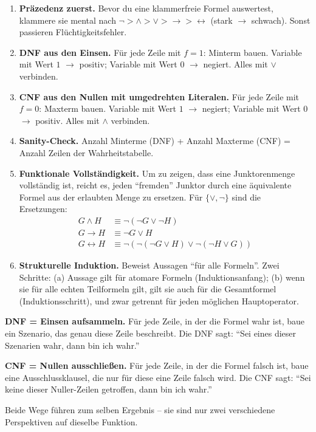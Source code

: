 \documentclass[a4paper,12pt]{article}
\begin{document}
\begin{merkbox}[title={Goldene Regeln zum Mitnehmen}]
\begin{enumerate}
\item \textbf{Pr\"azedenz zuerst.} Bevor du eine klammerfreie Formel
      auswertest, klammere sie mental nach $\neg > \wedge > \vee > \to
      > \leftrightarrow$ (stark $\to$ schwach). Sonst passieren
      Fl\"uchtigkeitsfehler.

\item \textbf{DNF aus den Einsen.} F\"ur jede Zeile mit $f = 1$:
      Minterm bauen. Variable mit Wert $1$ $\to$ positiv; Variable mit
      Wert $0$ $\to$ negiert. Alles mit $\vee$ verbinden.

\item \textbf{CNF aus den Nullen mit umgedrehten Literalen.} F\"ur
      jede Zeile mit $f = 0$: Maxterm bauen. Variable mit Wert $1$
      $\to$ negiert; Variable mit Wert $0$ $\to$ positiv. Alles mit
      $\wedge$ verbinden.

\item \textbf{Sanity-Check.} Anzahl Minterme (DNF) + Anzahl Maxterme
      (CNF) = Anzahl Zeilen der Wahrheitstabelle.

\item \textbf{Funktionale Vollst\"andigkeit.} Um zu zeigen, dass eine
      Junktorenmenge vollst\"andig ist, reicht es, jeden "`fremden"'
      Junktor durch eine \"aquivalente Formel aus der erlaubten Menge
      zu ersetzen. F\"ur $\{\vee, \neg\}$ sind die Ersetzungen:
      \begin{align*}
        G \wedge H &\equiv \neg(\neg G \vee \neg H) \\
        G \to H &\equiv \neg G \vee H \\
        G \leftrightarrow H &\equiv \neg(\neg(\neg G \vee H) \vee \neg(\neg H \vee G))
      \end{align*}

\item \textbf{Strukturelle Induktion.} Beweist Aussagen "`f\"ur alle
      Formeln"'. Zwei Schritte: (a) Aussage gilt f\"ur atomare Formeln
      (Induktionsanfang); (b) wenn sie f\"ur alle echten Teilformeln
      gilt, gilt sie auch f\"ur die Gesamtformel (Induktionsschritt),
      und zwar getrennt f\"ur jeden m\"oglichen Hauptoperator.
\end{enumerate}
\end{merkbox}

\begin{analogie}[title={Merke: DNF vs.\ CNF}]
\textbf{DNF = Einsen aufsammeln.} F\"ur jede Zeile, in der die Formel
wahr ist, baue ein Szenario, das genau diese Zeile beschreibt. Die
DNF sagt: "`Sei eines dieser Szenarien wahr, dann bin ich wahr."'

\medskip
\textbf{CNF = Nullen ausschlie{\ss}en.} F\"ur jede Zeile, in der die
Formel falsch ist, baue eine Ausschlussklausel, die nur f\"ur diese
eine Zeile falsch wird. Die CNF sagt: "`Sei keine dieser Nuller-Zeilen
getroffen, dann bin ich wahr."'

\medskip
Beide Wege f\"uhren zum selben Ergebnis -- sie sind nur zwei
verschiedene Perspektiven auf dieselbe Funktion.
\end{analogie}
\end{document}
